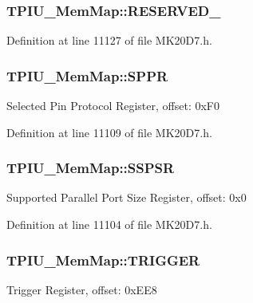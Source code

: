 \subsubsection[{\texorpdfstring{R\+E\+S\+E\+R\+V\+E\+D\+\_\+7}{RESERVED_7}}]{ T\+P\+I\+U\+\_\+\+Mem\+Map\+::\+R\+E\+S\+E\+R\+V\+E\+D\+\_}\hypertarget{struct_t_p_i_u___mem_map_a5aa89d7adc3b10c6899ec15076c3e214}{}\label{struct_t_p_i_u___mem_map_a5aa89d7adc3b10c6899ec15076c3e214}


Definition at line 11127 of file M\+K20\+D7.\+h.

\subsubsection[{\texorpdfstring{S\+P\+PR}{SPPR}}]{ T\+P\+I\+U\+\_\+\+Mem\+Map\+::\+S\+P\+PR}\hypertarget{struct_t_p_i_u___mem_map_a1b821d4f74563499ff569877ae672742}{}\label{struct_t_p_i_u___mem_map_a1b821d4f74563499ff569877ae672742}
Selected Pin Protocol Register, offset\+: 0x\+F0 

Definition at line 11109 of file M\+K20\+D7.\+h.

\subsubsection[{\texorpdfstring{S\+S\+P\+SR}{SSPSR}}]{ T\+P\+I\+U\+\_\+\+Mem\+Map\+::\+S\+S\+P\+SR}\hypertarget{struct_t_p_i_u___mem_map_a3570cf26e2ddc1d5700776743b0506e3}{}\label{struct_t_p_i_u___mem_map_a3570cf26e2ddc1d5700776743b0506e3}
Supported Parallel Port Size Register, offset\+: 0x0 

Definition at line 11104 of file M\+K20\+D7.\+h.

\subsubsection[{\texorpdfstring{T\+R\+I\+G\+G\+ER}{TRIGGER}}]{ T\+P\+I\+U\+\_\+\+Mem\+Map\+::\+T\+R\+I\+G\+G\+ER}\hypertarget{struct_t_p_i_u___mem_map_a267271b4e2d7ad48cba1614440c741fb}{}\label{struct_t_p_i_u___mem_map_a267271b4e2d7ad48cba1614440c741fb}
Trigger Register, offset\+: 0x\+E\+E8 

